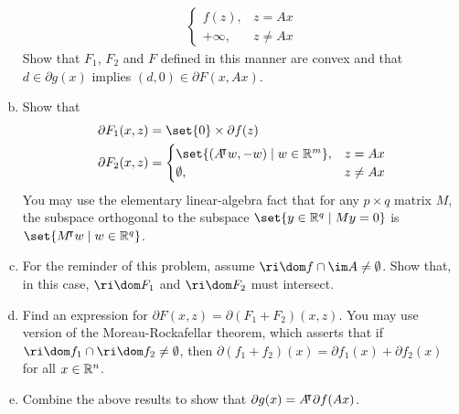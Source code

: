\documentclass{article}
\begin{document}
\begin{problem}
\begin{enumerate}[(a)]
{\begin{align*}
\begin{cases}
                    f(z), & z=Ax \\
                    +\infty, & z\neq Ax
                \end{cases}
            \end{align*}
        }
        Show that $F_1$, $F_2$ and $F$ defined in this manner are convex and that $d\in\partial g(x)$ implies $(d,0)\in\partial F(x,Ax)$.
        \item Show that {
            \begin{align*}
                \partial F_1(x,z) &= \set{0}\times\partial f(z) \\
                \partial F_2(x,z) &= \begin{cases}
                    \set{(A\trn w,-w)\mid w\in\R^m}, & z=Ax \\
                    \emptyset, & z\neq Ax
                \end{cases}
            \end{align*}
        }
        You may use the elementary linear-algebra fact that for any $p\times q$ matrix $M$, the subspace orthogonal to the subspace $\set{y\in\R^q\mid My=0}$ is $\set{M\trn w\mid w\in\R^q}$.
        \item For the reminder of this problem, assume $\ri\dom f \cap \im A\neq\emptyset$. Show that, in this case, $\ri\dom F_1$ and $\ri \dom F_2$ must intersect.
        \item Find an expression for $\partial F(x,z)=\partial(F_1+F_2)(x,z).$ You may use version of the Moreau-Rockafellar theorem, which asserts that if $\ri\dom f_1\cap\ri\dom f_2\neq\emptyset$, then $\partial(f_1+f_2)(x)=\partial f_1(x)+\partial f_2(x)$ for all $x\in\mathbb{R}^n$.
        \item Combine the above results to show that $\partial g(x)=A{}^{\mkern-4mu\intercal}\partial f(Ax)$.
    \end{enumerate}
\end{problem}
\end{document}
